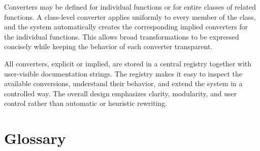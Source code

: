\documentclass[12pt,fleqn]{extarticle}
\begin{document}
Converters may be defined for individual functions or for entire classes
of related functions. A class-level converter applies uniformly to every
member of the class, and the system automatically creates the
corresponding implied converters for the individual functions. This
allows broad transformations to be expressed concisely while keeping the
behavior of each converter transparent.

All converters, explicit or implied, are stored in a central registry
together with user-visible documentation strings. The registry makes it
easy to inspect the available conversions, understand their behavior, and
extend the system in a controlled way. The overall design emphasizes
clarity, modularity, and user control rather than automatic or heuristic
rewriting.



\section{Glossary}
\end{document}
